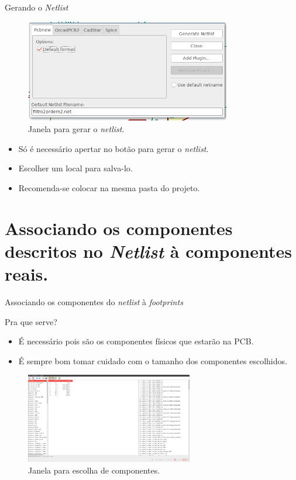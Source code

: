 \documentclass{beamer}
\begin{document}
\begin{frame}{Gerando o \textit{Netlist}}
	\begin{figure}
		\centering
		\includegraphics[width=0.8\textwidth]{Imagens/15_netlist_janela.png}
		\caption{Janela para gerar o \textit{netlist}.}
	\end{figure}
	\pause
	\begin{itemize}
		\item Só é necessário apertar no botão para gerar o \textit{netlist}.
		\item Escolher um local para salva-lo.
		\item Recomenda-se colocar na mesma pasta do projeto.
	\end{itemize}
\end{frame}

\section{Associando os componentes descritos no \textit{Netlist} à componentes reais.}
\begin{frame}{Associando os componentes do \textit{netlist} à \textit{footprints}}
	\begin{block}{Pra que serve?}
		\begin{itemize}
			\item É necessário pois são os componentes físicos que estarão na PCB.
			\item É sempre bom tomar cuidado com o tamanho dos componentes escolhidos.
		\end{itemize}
	\end{block}
	\pause
	\begin{figure}
		\centering
		\includegraphics[width=0.65\textwidth]{Imagens/17_associar_janela.png}
		\caption{Janela para escolha de componentes.}
	\end{figure}
\end{frame}
\end{document}
